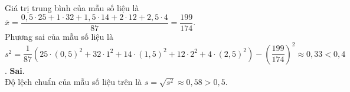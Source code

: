 \begin{ex}
{\begin{itemchoice}
\begin{center}
\begin{tabular}{|c|c|c|c|c|c|}
					\hline
				\end{tabular}
			\end{center}
			Giá trị trung bình của mẫu số liệu là\\ $\overline{x}=\dfrac{0{,}5\cdot 25+1\cdot 32+1{,5}\cdot 14+2\cdot 12+2{,5}\cdot 4}{87}=\dfrac{199}{174}$.\\
			Phương sai của mẫu số liệu là\\ $s^2=\dfrac{1}{87}\left(25\cdot (0{,}5)^2+32\cdot 1^2+14\cdot (1{,}5)^2+12\cdot 2^2+4\cdot (2{,}5)^2\right)-\left(\dfrac{199}{174}\right)^2\approx 0{,}33<0{,}4$.
			\itemch \textbf{Sai}.\\
			Độ lệch chuẩn của mẫu số liệu trên là  $s=\sqrt{s^2}\approx 0{,}58>0{,}5$.
		\end{itemchoice}
	}
\end{ex}

